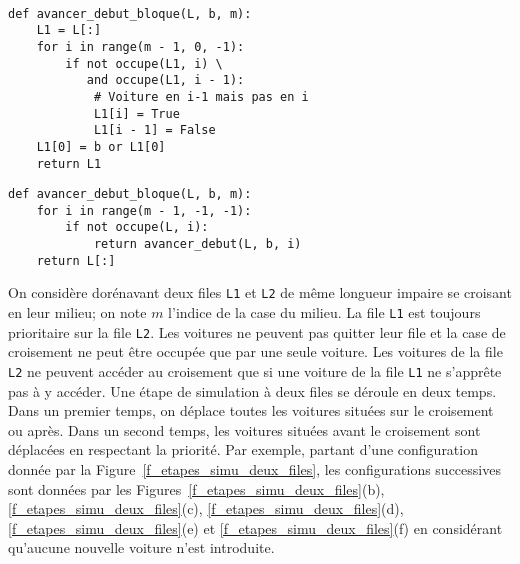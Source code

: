 \ifprof
\begin{corrige}~\\ \vspace{-.5cm}
\begin{lstlisting}
def avancer_debut_bloque(L, b, m):
    L1 = L[:]
    for i in range(m - 1, 0, -1):
        if not occupe(L1, i) \
           and occupe(L1, i - 1): 
            # Voiture en i-1 mais pas en i
            L1[i] = True
            L1[i - 1] = False
    L1[0] = b or L1[0]
    return L1
\end{lstlisting}

\begin{lstlisting}
def avancer_debut_bloque(L, b, m):
    for i in range(m - 1, -1, -1):
        if not occupe(L, i):
            return avancer_debut(L, b, i)
    return L[:]
\end{lstlisting}
\end{corrige}
\else
\fi

\ifprof
\else

On considère dorénavant deux files \lstinline{L1} et \lstinline{L2} de même longueur impaire se croisant en leur
milieu; on note $m$ l'indice de la case du milieu. La file \lstinline{L1} est toujours prioritaire sur la file \lstinline{L2}. Les
voitures ne peuvent pas quitter leur file et la case de croisement ne peut être occupée que par une
seule voiture. Les voitures de la file \lstinline{L2} ne peuvent accéder au croisement que si une voiture de la
file \lstinline{L1} ne s'apprête pas à y accéder. Une étape de simulation à deux files se déroule en deux temps.
Dans un premier temps, on déplace toutes les voitures situées sur le croisement ou après. Dans un
second temps, les voitures situées avant le croisement sont déplacées en respectant la priorité. Par
exemple, partant d'une configuration donnée par la Figure~\ref{f_etapes_simu_deux_files}, les configurations successives sont
données par les Figures~\ref{f_etapes_simu_deux_files}(b), \ref{f_etapes_simu_deux_files}(c), \ref{f_etapes_simu_deux_files}(d), \ref{f_etapes_simu_deux_files}(e) et \ref{f_etapes_simu_deux_files}(f) en considérant qu'aucune nouvelle voiture n'est
introduite.

\fi




